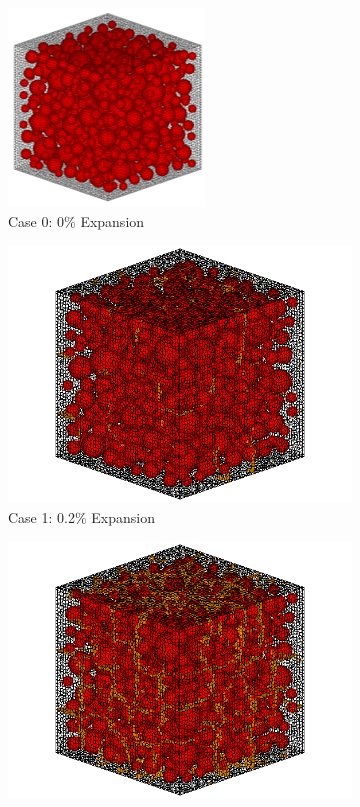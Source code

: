 \begin{figure}[ht!]
\centering

    \begin{subfigure}{.5\textwidth}
      \centering
      \includegraphics[width=.6\linewidth]{Files/exp_3D/A30Undamaged.png} 
    \caption{Case 0: 0\% Expansion}
    \end{subfigure}%
    \begin{subfigure}{.5\textwidth}
      \centering
      \includegraphics[width=.8\linewidth]{Files/exp_3D/DEF/A30X-1C_1_c.png}
    \caption{Case 1: 0.2\% Expansion}
    \end{subfigure}
    \begin{subfigure}{.5\textwidth}
      \centering
      \includegraphics[width=.8\linewidth]{Files/exp_3D/DEF/A30X-1C_2_c.png}

\end{subfigure}
\end{figure}
